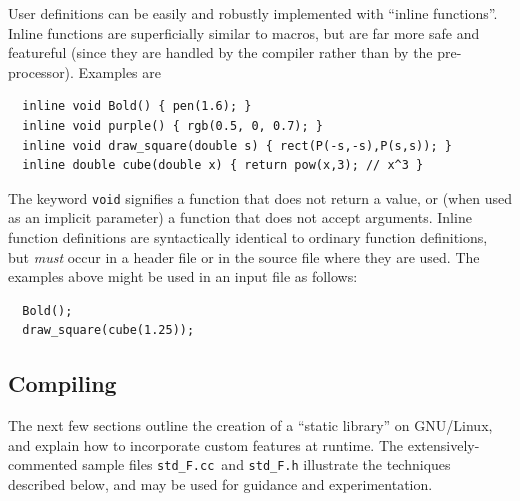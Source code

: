 \documentclass[12pt,letterpaper]{book}
\newcommand{\code}[1]{\texttt{#1}}
\newcommand{\filename}[1]{\texttt{#1}}
\begin{document}
User definitions can be easily and robustly implemented with ``inline
functions''. Inline functions are superficially similar to macros, but
are far more safe and featureful (since they are handled by the
compiler rather than by the pre-processor).  Examples are
\begin{verbatim}
  inline void Bold() { pen(1.6); }
  inline void purple() { rgb(0.5, 0, 0.7); }
  inline void draw_square(double s) { rect(P(-s,-s),P(s,s)); }
  inline double cube(double x) { return pow(x,3); // x^3 }
\end{verbatim}
The keyword \code{void} signifies a function that does not return a
value, or (when used as an implicit parameter) a function that does
not accept arguments. Inline function definitions are syntactically
identical to ordinary function definitions, but \emph{must} occur in a
header file or in the source file where they are used. The examples
above might be used in an input file as follows:
\begin{verbatim}
  Bold();  
  draw_square(cube(1.25));
\end{verbatim}


\subsection{Compiling}

The next few sections outline the creation of a ``static library'' on
GNU/Linux, and explain how to incorporate custom features at runtime.
The extensively-commented sample files \filename{std\_F.cc}~and
\filename{std\_F.h} illustrate the techniques described below, and may
be used for guidance and experimentation.
\end{document}
